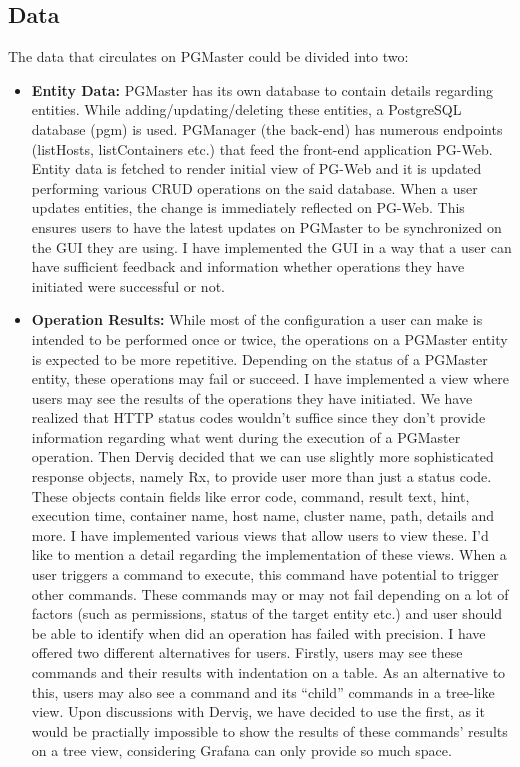 \subsection{Data}
The data that circulates on PGMaster could be divided into two:
\begin{itemize}
    \item \textbf{Entity Data:} PGMaster has its own database to contain 
    details regarding entities. While adding/updating/deleting these entities, 
    a PostgreSQL database (pgm) is used. PGManager (the back-end) has numerous 
    endpoints (listHosts, listContainers etc.) that feed the front-end 
    application PG-Web. Entity data is fetched to render initial view of
    PG-Web and it is updated performing various CRUD operations on the said 
    database. When a user updates entities, the change is immediately 
    reflected on PG-Web. This ensures users to have the latest updates on 
    PGMaster to be synchronized on the GUI they are using. I have implemented 
    the GUI in a way that a user can have sufficient feedback and information 
    whether operations they have initiated were successful or not.
    \item \textbf{Operation Results:} While most of the configuration a user 
    can make is intended to be performed once or twice, the operations on a 
    PGMaster entity is expected to be more repetitive. Depending on the status 
    of a PGMaster entity, these operations may fail or succeed. I have 
    implemented a view where users may see the results of the operations they 
    have initiated. We have realized that HTTP status codes wouldn't suffice 
    since they don't provide information regarding what went during the 
    execution of a PGMaster operation. Then Derviş decided that we can use 
    slightly more sophisticated response objects, namely Rx, to provide user 
    more than just a status code. These objects contain fields like error 
    code, command, result text, hint, execution time, container name, host 
    name, cluster name, path, details and more. I have implemented various 
    views that allow users to view these. I'd like to mention a detail 
    regarding the implementation of these views. When a user triggers a 
    command to execute, this command have potential to trigger other commands. 
    These commands may or may not fail depending on a lot of factors (such 
    as permissions, status of the target entity etc.) and user should be 
    able to identify when did an operation has failed with precision. I have 
    offered two different alternatives for users. Firstly, users may see 
    these commands and their results with indentation on a table. As an 
    alternative to this, users may also see a command and its ``child'' 
    commands in a tree-like view. Upon discussions with Derviş, we have decided 
    to use the first, as it would be practially impossible to show the results 
    of these commands' results on a tree view, considering Grafana can only 
    provide so much space.

\end{itemize}

